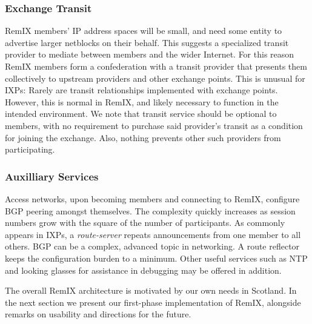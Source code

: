 \subsubsection{Exchange Transit}

RemIX members' IP address spaces will be small, and need some entity to
advertise larger netblocks on their behalf. This suggests a specialized transit
provider to mediate between members and the wider Internet. For this reason
RemIX members form a  confederation with a transit provider that
presents them collectively to upstream providers and other exchange points. This
is unusual for \acp{IXP}: Rarely are transit relationships implemented with
exchange points. However, this is normal in RemIX, and likely necessary to
function in the intended environment. We note that transit service should be
optional to members, with no requirement to purchase said provider's transit as
a condition for joining the exchange. Also, nothing prevents other such
providers from participating.

\subsubsection{Auxilliary Services}

Access networks, upon becoming members and connecting to RemIX,  configure
\ac{BGP} peering amongst themselves. The complexity quickly increases as session
numbers grow with the square of the number of participants. As commonly appears
in \acp{IXP}, a \emph{route-server} repeats announcements from one member to all
others. \ac{BGP} can be a complex, advanced topic in networking. A route
reflector keeps the configuration burden to a minimum. Other useful services
such as \ac{NTP} and looking glasses for assistance in debugging may be offered
in addition.


The overall RemIX architecture is motivated by our own needs in Scotland. In
the next section we present our first-phase implementation of RemIX,
alongside remarks on usability and directions for the future.

